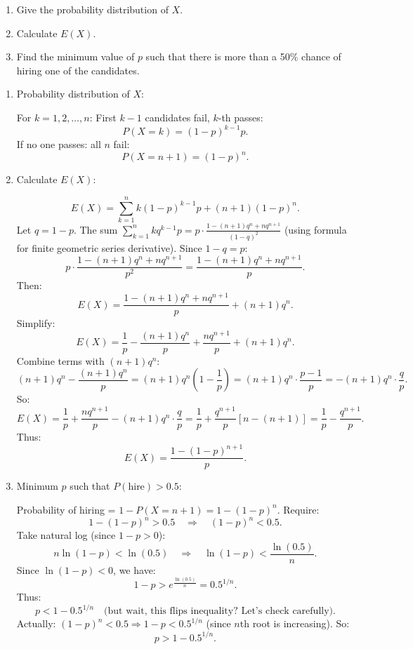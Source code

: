 \documentclass[12pt]{article}
\begin{document}
\begin{enumerate}
    \item Give the probability distribution of \( X \).
    \item Calculate \( E(X) \).
    \item Find the minimum value of \( p \) such that there is more than a 50\% chance of hiring one of the candidates.
\end{enumerate}

\begin{answerbox}
\begin{enumerate}
  \item Probability distribution of \(X\):

  For \(k = 1, 2, \dots, n\):  
First \(k-1\) candidates fail, \(k\)-th passes:
\[
P(X = k) = (1-p)^{k-1} p.
\]
If no one passes: all \(n\) fail:
\[
P(X = n+1) = (1-p)^n.
\]

  \item Calculate \(E(X)\):

\[
E(X) = \sum_{k=1}^{n} k (1-p)^{k-1} p + (n+1)(1-p)^n.
\]
Let \(q = 1-p\). The sum \(\sum_{k=1}^{n} k q^{k-1} p = p \cdot \frac{1 - (n+1)q^n + n q^{n+1}}{(1-q)^2}\) (using formula for finite geometric series derivative). Since \(1-q = p\):
\[
p \cdot \frac{1 - (n+1)q^n + n q^{n+1}}{p^2} = \frac{1 - (n+1)q^n + n q^{n+1}}{p}.
\]
Then:
\[
E(X) = \frac{1 - (n+1)q^n + n q^{n+1}}{p} + (n+1)q^n.
\]
Simplify:
\[
E(X) = \frac{1}{p} - \frac{(n+1)q^n}{p} + \frac{n q^{n+1}}{p} + (n+1)q^n.
\]
Combine terms with \((n+1)q^n\):
\[
(n+1)q^n - \frac{(n+1)q^n}{p} = (n+1)q^n \left(1 - \frac{1}{p}\right) = (n+1)q^n \cdot \frac{p-1}{p} = -(n+1)q^n \cdot \frac{q}{p}.
\]
So:
\[
E(X) = \frac{1}{p} + \frac{n q^{n+1}}{p} - (n+1)q^n \cdot \frac{q}{p} = \frac{1}{p} + \frac{q^{n+1}}{p} \left[ n - (n+1) \right] = \frac{1}{p} - \frac{q^{n+1}}{p}.
\]
Thus:
\[
E(X) = \frac{1 - (1-p)^{n+1}}{p}.
\]

  \item Minimum \(p\) such that \(P(\text{hire}) > 0.5\):

  Probability of hiring = \(1 - P(X = n+1) = 1 - (1-p)^n\).  
Require:
\[
1 - (1-p)^n > 0.5 \quad \Rightarrow \quad (1-p)^n < 0.5.
\]
Take natural log (since \(1-p > 0\)):
\[
n \ln(1-p) < \ln(0.5) \quad \Rightarrow \quad \ln(1-p) < \frac{\ln(0.5)}{n}.
\]
Since \(\ln(1-p) < 0\), we have:
\[
1-p > e^{\frac{\ln(0.5)}{n}} = 0.5^{1/n}.
\]
Thus:
\[
p < 1 - 0.5^{1/n} \quad \text{(but wait, this flips inequality? Let's check carefully).}
\]
Actually: \((1-p)^n < 0.5 \Rightarrow 1-p < 0.5^{1/n}\) (since \(n\)th root is increasing). So:
\[
p > 1 - 0.5^{1/n}.
\]
\end{enumerate}
\end{answerbox}

\end{document}

